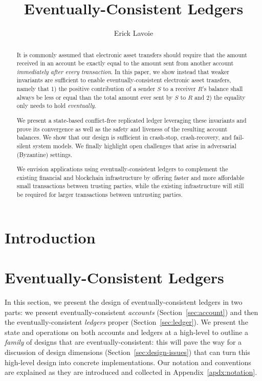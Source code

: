 \documentclass[9pt, oneside]{article}   	%
\title{Eventually-Consistent Ledgers}
\author{Erick Lavoie}
\begin{document}
\maketitle


\begin{abstract}
It is commonly assumed that electronic asset transfers should require that the amount received in an account be exactly equal to the amount sent from another account \textit{immediately after every transaction}.  In this paper, we show instead that weaker invariants are sufficient to enable eventually-consistent electronic asset transfers, namely that 1) the positive contribution of a sender $S$ to a receiver $R$'s balance shall always be less or equal than the total amount ever sent by $S$ to $R$ and 2) the equality only needs to hold \textit{eventually}.

We present a state-based conflict-free replicated ledger leveraging these invariants and prove its convergence as well as the safety and liveness of the resulting account balances. We show that our design is sufficient in crash-stop, crash-recovery, and fail-silent system models. We finally highlight open challenges that arise in adversarial (Byzantine) settings. 

We envision applications using eventually-consistent ledgers to complement the existing financial and blockchain infrastructure by offering faster and more affordable small transactions between trusting parties, while the existing infrastructure will still be required for larger transactions between untrusting parties.
\end{abstract}

\section{Introduction}
\label{sec:introduction}

\section{Eventually-Consistent Ledgers}

In this section, we present the design of eventually-consistent ledgers in two parts: we present eventually-consistent \textit{accounts} (Section~\ref{sec:account}) and then the eventually-consistent \textit{ledgers} proper (Section~\ref{sec:ledger}). We present the state and operations on both accounts and ledgers at a high-level to outline a \textit{family} of designs that are eventually-consistent: this will pave the way for a discussion of design dimensions (Section~\ref{sec:design-issues}) that can turn this high-level design into concrete implementations. Our notation and conventions are explained as they are introduced and collected in Appendix~\ref{apdx:notation}.
\end{document}
